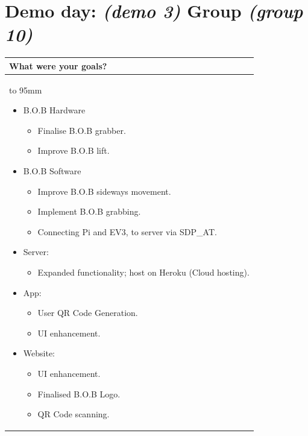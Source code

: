 \documentclass[a4paper]{article}
\newcommand{\colWidth}{141mm}
\begin{document}
 
\section*{Demo day: \textit{(demo 3)} Group \textit{(group 10)}}


\begin{center}
\begin{tabular}{|p{\colWidth}|}
	\hline
	\cellcolor{blue!25}\large
	\textbf{What were your goals?}
	\\ \hline
	\vtop to 95mm{
\begin{itemize}
    \item B.O.B Hardware
    \begin{itemize}
         \item Finalise B.O.B grabber. 
         \item Improve B.O.B lift. 
    \end{itemize}
    \item B.O.B Software
    \begin{itemize} 
        \item Improve B.O.B sideways movement.
        \item Implement B.O.B grabbing.
        \item Connecting Pi and EV3, to server via SDP\_AT.
    \end{itemize}
    \item Server: 
    \begin{itemize}
        \item Expanded functionality; host on Heroku (Cloud hosting).
    \end{itemize}
    \item App:
    \begin{itemize}
        \item User QR Code Generation.
        \item UI enhancement.
    \end{itemize}
    \item Website: 
    \begin{itemize}
        \item UI enhancement.
        \item Finalised B.O.B Logo.
        \item QR Code scanning.
    \end{itemize}
\end{itemize}
  }
  \\
  \hline
\end{tabular}
\vskip 5mm


\end{center}
\end{document}
